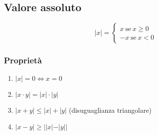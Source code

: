 \subsection{Valore assoluto}
\begin{Large}
    \[
        |x| = \begin{cases}
                x\ \mbox{se}\ x \geq 0\\
                -x\ \mbox{se}\ x < 0
            \end{cases}  
    \]
\end{Large}
\subsubsection*{Proprietà}
\begin{enumerate}
    \item $|x| = 0 \iff x = 0$
    \item $|x \cdot y| = |x| \cdot |y|$
    \item $|x + y| \leq |x| + |y|$ (disuguaglianza triangolare)
    \item $|x - y| \geq ||x| - |y||$
\end{enumerate}